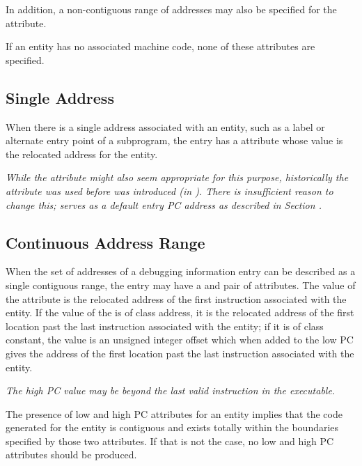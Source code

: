 In addition, a non-contiguous range of 
addresses may also be specified for the
\DWATstartscope{} attribute.

If an entity has no associated machine code, 
none of these attributes are specified.

\subsection{Single Address} 
When there is a single address associated with an entity,
such as a label or alternate entry point of a subprogram,
the entry has a \DWATlowpc{} attribute whose value is the
relocated address for the entity.

\textit{While the \DWATentrypc{}
attribute might also seem appropriate for this purpose,
historically the \DWATlowpc{} attribute was used before
\DWATentrypc{} was introduced 
(in ). There is
insufficient reason to change this;
\DWATlowpc{} serves as a default entry PC address as described
in Section .}

\subsection{Continuous Address Range}
\label{chap:contiguousaddressranges}
When the set of addresses of a debugging information entry can
be described as a single contiguous range, the entry 
may 
have
a \DWATlowpc{} and 
\DWAThighpc{} pair of attributes. 
The value
of the 
\DWATlowpc{} attribute 
is the relocated address of the
first instruction associated with the entity. If the value of
the \DWAThighpc{} is of class address, it is the relocated
address of the first location past the last instruction
associated with the entity; if it is of class constant, the
value is an unsigned integer offset which when added to the
low PC gives the address of the first location past the last
instruction associated with the entity.

\textit{The high PC value
may be beyond the last valid instruction in the executable.}

The presence of low and high PC attributes for an entity
implies that the code generated for the entity is contiguous
and exists totally within the boundaries specified by those
two attributes. If that is not the case, no low and high PC
attributes should be produced.

